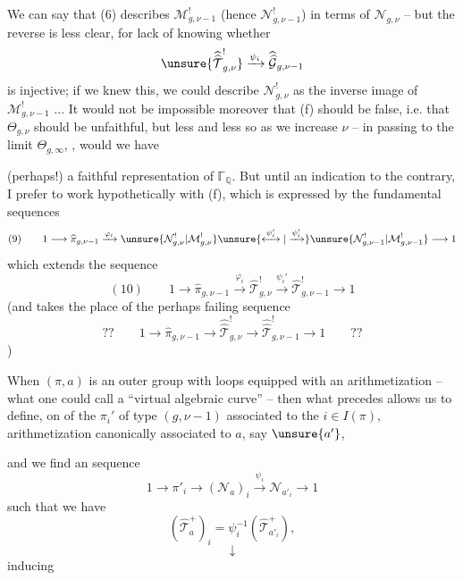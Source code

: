 We can say that (6) describes $\mathcal M_{g,\nu-1}^{!}$ (hence $\mathcal N_{g,\nu-1}^{!}$) in terms of $\mathcal N_{g,\nu}$ -- but the reverse is less clear, for lack of knowing whether
\[
\unsure{\widehat{\widehat{\mathcal T}}_{g,\nu}^{!}}
\xrightarrow{\psi_i}
\widehat{\widehat{\mathcal G}}_{g,\nu-1}
\]
is injective; if we knew this, we could describe $\mathcal N_{g,\nu}^{!}$ as the inverse image of $\mathcal M_{g,\nu-1}^{!}$ ...  It would not be impossible moreover that (f) should be false, i.e. that  $\Theta_{g,\nu}$ should be unfaithful, but less and less so as we increase $\nu$ -- in passing to the  limit $\Theta_{g,\infty}$, , would we have


(perhaps!) a faithful representation of $\mathbb{\Gamma}_{\mathbb Q}$. But until an indication to the contrary, I prefer to work hypothetically with (f), which is expressed by the fundamental  sequences
\[
(9)\qquad
1\longrightarrow\widehat{\pi}_{g,\nu-1}
\xrightarrow{\varphi_i}
\unsure{\mathcal N_{g,\nu}^{!}|\mathcal M_{g,\nu}^{!}}
\unsure{\overset{\psi_i'}{\longleftrightarrow}|\xrightarrow{\psi_i'}}
\unsure{\mathcal N_{g,\nu-1}^{!}|\mathcal M_{g,\nu-1}^{!}}
\longrightarrow1
\]
which extends the  sequence
\[
(10)\qquad
1\longrightarrow\widehat{\pi}_{g,\nu-1}
\xrightarrow{\varphi_i}
\widehat{\mathcal T}_{g,\nu}^{!}
\xrightarrow{\psi_i'}
\widehat{\mathcal T}_{g,\nu-1}^{!}
\longrightarrow1
\]
(and takes the place of the perhaps failing  sequence
\[
??\qquad
1\longrightarrow\widehat{\pi}_{g,\nu-1}
\longrightarrow\widehat{\widehat{\mathcal T}}_{g,\nu}^{!}
\longrightarrow\widehat{\widehat{\mathcal T}}_{g,\nu-1}^{!}
\longrightarrow1
\qquad??
\]
)

When $(\pi,a)$ is an outer group with loops equipped with an arithmetization -- what one could call a ``virtual algebraic curve'' -- then what precedes allows us to define, on  of the $\pi_i'$ of type $(g,\nu-1)$ associated to the $i\in I(\pi)$,  arithmetization canonically associated to $a$, say $\unsure{a'}$,


and we find  an  sequence
\[
1 \longrightarrow \pi'_i \longrightarrow (\mathcal{N}_a)_i
\xrightarrow{\psi_i} \mathcal{N}_{a'_i} \longrightarrow 1
\tag{11}
\]
such that we have
\[
(\widehat{\mathcal{T}}^{+}_a)_i
=\psi_i^{-1}(\widehat{\mathcal{T}}^{+}_{a'_i}),
\tag{12}
\]
\[
\downarrow
\]
inducing

